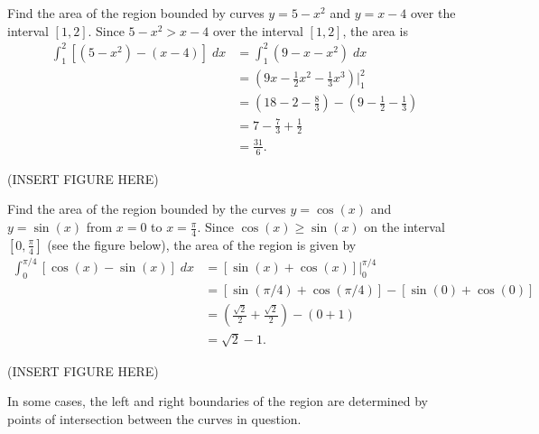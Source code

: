 \documentclass{ximera}
\begin{document}
\begin{example} %
Find the area of the region bounded by curves $y = 5 - x^2$ and $y = x-4$ over the interval $[1,2]$.
Since $5 - x^2 > x-4$ over the interval $[1,2]$, the area is
\begin{align*}
\int_1^2 \left[(5-x^2) - (x-4)\right] \; dx &= \int_1^2 \left(9-x-x^2\right) \; dx \\
                                           &= \left(9x - \frac12 x^2 - \frac13 x^3 \right) \bigg|_1^2 \\
                                           &= \left(18 - 2 - \frac83 \right) - \left(9 - \frac12 - \frac13 \right)\\
                                           &= 7 - \frac73 + \frac12 \\
                                           & = \frac{31}{6}.
\end{align*}
                                           
(INSERT FIGURE HERE)

\end{example}

\begin{example}
Find the area of the region bounded by the curves $y = \cos(x)$ and $y = \sin(x)$ from $x = 0$ to $x = \frac{\pi}{4}$.
Since $\cos(x) \geq \sin(x)$ on the interval $\left[0, \frac{\pi}{4}\right]$ (see the figure below), the area of the region is given by
\begin{align*}
\int_0^{\pi/4} [\cos(x) - \sin(x)] \; dx &= [\sin(x) + \cos(x)]\Big|_0^{\pi/4} \\
                                         &= [\sin(\pi/4) + \cos(\pi/4)] - [\sin(0) + \cos(0)]\\
                                          &= \left(\tfrac{\sqrt 2}{2} + \tfrac{\sqrt 2}{2} \right) - (0 + 1) \\
                                         &= \sqrt 2 - 1.
\end{align*}

(INSERT FIGURE HERE)

\end{example}
                                         

In some cases, the left and right boundaries of the region are determined by points of intersection between the curves in question.
\end{document}

